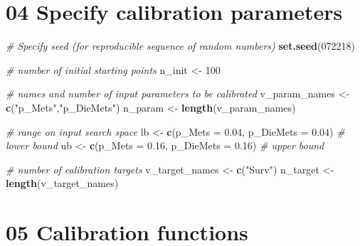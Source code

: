 \documentclass[
]{article}
\newenvironment{Shaded}{\begin{snugshade}}{\end{snugshade}}
\newcommand{\CommentTok}[1]{\textcolor[rgb]{0.56,0.35,0.01}{\textit{#1}}}
\newcommand{\DataTypeTok}[1]{\textcolor[rgb]{0.13,0.29,0.53}{#1}}
\newcommand{\DecValTok}[1]{\textcolor[rgb]{0.00,0.00,0.81}{#1}}
\newcommand{\FloatTok}[1]{\textcolor[rgb]{0.00,0.00,0.81}{#1}}
\newcommand{\KeywordTok}[1]{\textcolor[rgb]{0.13,0.29,0.53}{\textbf{#1}}}
\newcommand{\NormalTok}[1]{#1}
\newcommand{\StringTok}[1]{\textcolor[rgb]{0.31,0.60,0.02}{#1}}
\begin{document}
\hypertarget{specify-calibration-parameters}{%
\section{04 Specify calibration
parameters}\label{specify-calibration-parameters}}

\begin{Shaded}
\begin{Highlighting}[]
\CommentTok{# Specify seed (for reproducible sequence of random numbers)}
\KeywordTok{set.seed}\NormalTok{(}\DecValTok{072218}\NormalTok{)}

\CommentTok{# number of initial starting points}
\NormalTok{n_init <-}\StringTok{ }\DecValTok{100}

\CommentTok{# names and number of input parameters to be calibrated}
\NormalTok{v_param_names <-}\StringTok{ }\KeywordTok{c}\NormalTok{(}\StringTok{"p_Mets"}\NormalTok{,}\StringTok{"p_DieMets"}\NormalTok{)}
\NormalTok{n_param <-}\StringTok{ }\KeywordTok{length}\NormalTok{(v_param_names)}

\CommentTok{# range on input search space}
\NormalTok{lb <-}\StringTok{ }\KeywordTok{c}\NormalTok{(}\DataTypeTok{p_Mets =} \FloatTok{0.04}\NormalTok{, }\DataTypeTok{p_DieMets =} \FloatTok{0.04}\NormalTok{) }\CommentTok{# lower bound}
\NormalTok{ub <-}\StringTok{ }\KeywordTok{c}\NormalTok{(}\DataTypeTok{p_Mets =} \FloatTok{0.16}\NormalTok{, }\DataTypeTok{p_DieMets =} \FloatTok{0.16}\NormalTok{) }\CommentTok{# upper bound}

\CommentTok{# number of calibration targets}
\NormalTok{v_target_names <-}\StringTok{ }\KeywordTok{c}\NormalTok{(}\StringTok{"Surv"}\NormalTok{)}
\NormalTok{n_target <-}\StringTok{ }\KeywordTok{length}\NormalTok{(v_target_names)}
\end{Highlighting}
\end{Shaded}

\hypertarget{calibration-functions}{%
\section{05 Calibration functions}\label{calibration-functions}}
\end{document}
